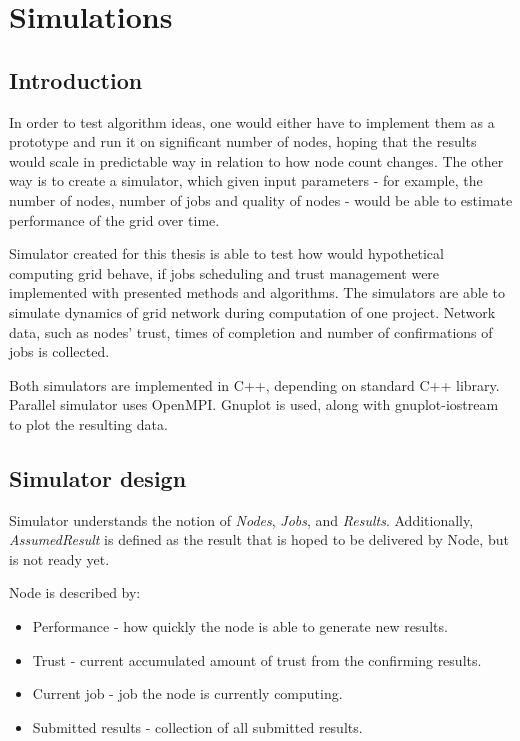 \chapter{Simulations}
\label{ch:simulations}

\section{Introduction}

In order to test algorithm ideas, one would either have to implement them as a prototype and run it on significant number of nodes, hoping that the results would scale in predictable way in relation to how node count changes. The other way is to create a simulator, which given input parameters - for example, the number of nodes, number of jobs and quality of nodes - would be able to estimate performance of the grid over time.

Simulator created for this thesis is able to test how would hypothetical computing grid behave, if jobs scheduling and trust management were implemented with presented methods and algorithms. The simulators are able to simulate dynamics of grid network during computation of one project. Network data, such as nodes' trust, times of completion and number of confirmations of jobs is collected.

Both simulators are implemented in C++, depending on standard C++ library. Parallel simulator uses OpenMPI. Gnuplot is used, along with gnuplot-iostream~\cite{gp-iostream} to plot the resulting data.

\section{Simulator design}

Simulator understands the notion of \emph{Nodes}, \emph{Jobs}, and \emph{Results}. Additionally, \emph{AssumedResult} is defined as the result that is hoped to be delivered by Node, but is not ready yet.

Node is described by:
\begin{itemize}
\item Performance - how quickly the node is able to generate new results.
\item Trust - current accumulated amount of trust from the confirming results.
\item Current job - job the node is currently computing.
\item Submitted results - collection of all submitted results.
\end{itemize}

